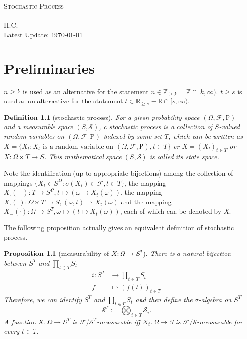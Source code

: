\documentclass{report}
\newtheorem{definition}{Definition}[section]
\newtheorem{proposition}{Proposition}[section]
\theoremstyle{nonumberplain}
\begin{document}
	  

~\\
\begin{center}	
	~\\ 
	\vspace{6em} 
	\textsc{\Huge Stochastic Process}	
	~\\
	\vspace{2.5em} 
	{\Large }
	~\\
	\vspace{6em}
	\textsf{H.C.}
	~\\
	\vspace{5in}  
	{\large Latest Update: \today}
\end{center}
\tableofcontents
\chapter{Preliminaries}

$n \ge k$ is used as an alternative for the
statement $n\in\mathbb{Z}_{\ge k}=\mathbb{Z}\cap[k,\infty)$. $t \ge s$ is used as an alternative for the statement $t\in\mathbb{R}_{\ge s}=\mathbb{R}\cap[s,\infty)$.
\begin{definition}[stochastic process]
For a given probability space $(\Omega ,{\mathcal{F}},\mathrm{P})$ and a measurable space $(S,\mathcal{S})$, a \emph{stochastic process} is a collection of $S$-valued random variables on $(\Omega ,{\mathcal{F}},\mathrm{P})$ indexed by some set $T$, which can be written as $X=\{X_t:X_t\text{ is a random variable on } (\Omega ,\mathcal{F},\mathrm{P}),t\in T\}$ or $X=(X_t)_{t\in T}$ or $X:\Omega \times T\rightarrow S$. This mathematical space $(S,\mathcal{S})$ is called its state space. 
\end{definition}

Note the identification (up to appropriate bijections) among the collection of mappings $\{X_t\in S^\Omega:\sigma(X_t)\in\mathcal{F},t\in T\}$, the mapping $X_\cdot(-):T \to S^\Omega,t\mapsto\left(\omega\mapsto X_{t}(\omega)\right)$, the mapping $X_\cdot(\cdot):\Omega \times T\rightarrow S,(\omega,t)\mapsto X_t(\omega)$ and the mapping $X_{-}(\cdot):\Omega\to S^T,\omega\mapsto \left(t\mapsto X_{t}(\omega)\right)$, each of which can be denoted by $X$.

The following proposition actually gives an equivalent definition of stochastic process.
\begin{proposition}[measurability of $X:\Omega\to S^T$]
	There is a natural bijection between $S^T$ and $\prod_{t\in T}S_t$
	\begin{align*}
	i:S^T&\longrightarrow \prod_{t\in T}S_t\\
	f&\longmapsto (f(t))_{t\in T}
	\end{align*} 
	Therefore, we can identify $S^T$ and $\prod_{t\in T}S_t$ and then define the $\sigma$-algebra on $S^T$
	\[
	\mathcal{S}^T:=\bigotimes_{i\in T}\mathcal{S}_i.
	\]
	A function $X: \Omega \rightarrow S^T$ is $\mathcal{F}/\mathcal{S}^{T}$-measurable iff $X_{t}: \Omega \rightarrow S$ is $\mathcal{F}/\mathcal{S}$-measurable for every $t \in T$.
\end{proposition}
\end{document}
